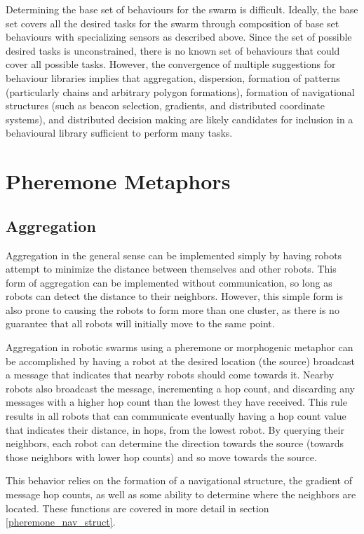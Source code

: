 \documentclass[]{article}
\begin{document}
Determining the base set of behaviours for the swarm is difficult. 
Ideally, the base set covers all the desired tasks for the swarm through composition of base set behaviours with specializing sensors as described above. 
Since the set of possible desired tasks is unconstrained, there is no known set of behaviours that could cover all possible tasks. 
However, the convergence of multiple suggestions for behaviour libraries implies that aggregation, dispersion, formation of patterns (particularly chains and arbitrary polygon formations), formation of navigational structures (such as beacon selection, gradients, and distributed coordinate systems), and distributed decision making are likely candidates for inclusion in a behavioural library sufficient to perform many tasks.  

\section{Pheremone Metaphors}

\subsection{Aggregation}

Aggregation in the general sense can be implemented simply by having robots attempt to minimize the distance between themselves and other robots. 
This form of aggregation can be implemented without communication, so long as robots can detect the distance to their neighbors. 
However, this simple form is also prone to causing the robots to form more than one cluster, as there is no guarantee that all robots will initially move to the same point. 

Aggregation in robotic swarms using a pheremone or morphogenic metaphor can be accomplished by having a robot at the desired location (the source) broadcast a message that indicates that nearby robots should come towards it. 
Nearby robots also broadcast the message, incrementing a hop count, and discarding any messages with a higher hop count than the lowest they have received. 
This rule results in all robots that can communicate eventually having a hop count value that indicates their distance, in hops, from the lowest robot. 
By querying their neighbors, each robot can determine the direction towards the source (towards those neighbors with lower hop counts) and so move towards the source. 

This behavior relies on the formation of a navigational structure, the gradient of message hop counts, as well as some ability to determine where the neighbors are located. These functions are covered in more detail in section \ref{pheremone_nav_struct}.
\end{document}
